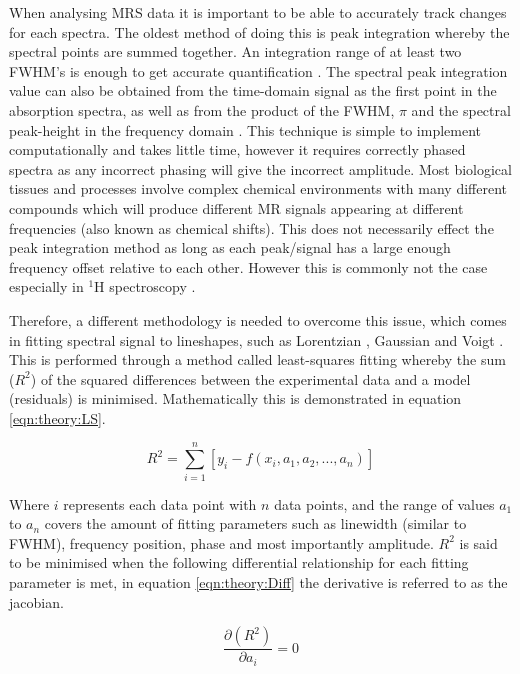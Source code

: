 When analysing \ac{MRS} data it is important to be able to accurately track changes for each spectra. The oldest method of doing this is peak integration whereby the spectral points are summed together. An integration range of at least two \ac{FWHM}'s is enough to get accurate quantification \cite{Near2021PreprocessingRecommendations}. The spectral peak integration value can also be obtained from the time-domain signal as the first point in the absorption spectra, as well as from the product of the \ac{FWHM}, $\pi$ and the spectral peak-height in the frequency domain \cite{deGraaf2019InSpectroscopy}. This technique is simple to implement computationally and takes little time, however it requires correctly phased spectra as any incorrect phasing will give the incorrect amplitude. Most biological tissues and processes involve complex chemical environments with many different compounds which will produce different MR signals appearing at different frequencies (also known as chemical shifts). This does not necessarily effect the peak integration method as long as each peak/signal has a large enough frequency offset relative to each other. However this is commonly not the case especially in $^1$H spectroscopy \cite{Alger2010QuantitativeReview}. 

Therefore, a different methodology is needed to overcome this issue, which comes in fitting spectral signal to lineshapes, such as Lorentzian \cite{Lorentz1895TheHeat}, Gaussian and Voigt \cite{Near2021PreprocessingRecommendations}. This is performed through a method called least-squares \cite{Golub1973TheSeparate} fitting whereby the sum ($R^2$) of the squared differences between the experimental data and a model (residuals) is minimised\cite{Vanhamme2001MRMethods}. Mathematically this is demonstrated in equation \ref{eqn:theory:LS}.

\begin{equation}
    R^2 = \sum_{i=1}^{n}[y_i - f(x_i,a_1,a_2,...,a_n)]
    \label{eqn:theory:LS}
\end{equation}

\noindent Where $i$ represents each data point with $n$ data points, and the range of values $a_1$ to $a_n$ covers the amount of fitting parameters such as linewidth (similar to \ac{FWHM}), frequency position, phase and most importantly amplitude. $R^2$ is said to be minimised when the following differential relationship for each fitting parameter is met, in equation \ref{eqn:theory:Diff} the derivative is referred to as the jacobian.

\begin{equation}
    \frac{\partial (R^2)}{\partial a_i} = 0
    \label{eqn:theory:Diff}
\end{equation}


